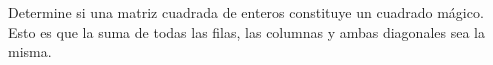 Determine si una matriz cuadrada de enteros constituye un cuadrado mágico. Esto es que la suma de todas las filas, las columnas y ambas diagonales sea la misma.
